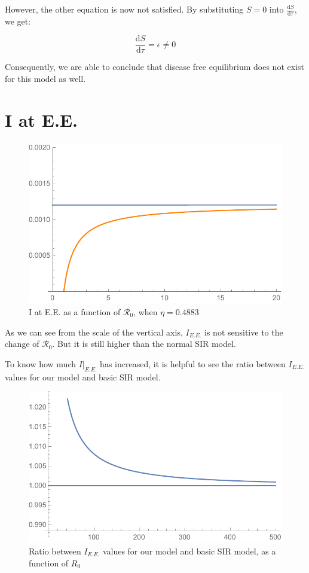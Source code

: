 \documentclass[12pt]{article}
\newcommand\dbyd[2]{\frac{\mathrm d{#1}}{\mathrm d{#2}}}
\newcommand{\R}{\mathcal{R}}
\begin{document}
However, the other equation is now not satisfied. By substituting $S=0$ into $\dbyd{S}{\tau}$, we get:

\begin{equation}
\dbyd{S}{\tau}=\epsilon\neq0
\end{equation}

Consequently, we are able to conclude that disease free equilibrium does not exist for this model as well.

\section{I at E.E.}

\begin{figure}[H]
  \caption{I at E.E. as a function of $\R_0$, when $\eta=0.4883$}
  \includegraphics[width=1\textwidth]{Figures/Plot_I_at_EE_vary_R_0.pdf}
\end{figure}

As we can see from the scale of the vertical axis, $I_{E.E.}$ is not sensitive to the change of $\R_0$. But it is still higher than the normal SIR model.

To know how much $I|_{E.E.}$ has increased, it is helpful to see the ratio between $I_{E.E.}$ values for our model and basic SIR model.

\begin{figure}[H]
  \caption{Ratio between $I_{E.E.}$ values for our model and basic SIR model, as a function of $R_0$}
  \includegraphics[width=1\textwidth]{Figures/Ratio_plot.pdf}
\end{figure}
\end{document}
